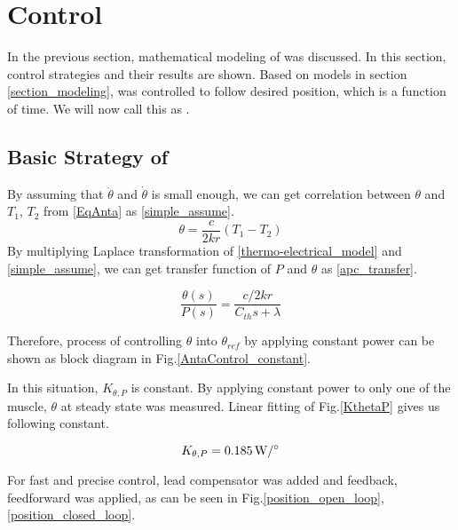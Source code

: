 \section{Control}
In the previous section, mathematical modeling of \scp was discussed. In this section, control strategies and their results are shown. Based on models in section \ref{section_modeling}, \anta was controlled to follow desired position, which is a function of time. We will now call this as \apcnospace.

\subsection{Basic Strategy of \APC}
By assuming that $\ddot{\theta}$ and $\dot{\theta}$ is small enough, we can get correlation between $\theta$ and $T_{1}$, $T_{2}$ from \eqref{EqAnta} as \eqref{simple_assume}.
\begin{equation} \label{simple_assume}
\theta = \frac{c}{2kr}(T_{1}-T_{2})
\end{equation}
By multiplying Laplace transformation of \eqref{thermo-electrical_model} and \eqref{simple_assume}, we can get transfer function of $P$ and $\theta$ as \eqref{apc_transfer}.

\begin{equation} \label{apc_transfer}
\frac{\theta(s)}{P(s)} = \frac{c/2kr}{C_{th}s+\lambda}
\end{equation}

Therefore, process of controlling $\theta$ into $\theta_{ref}$ by applying constant power can be shown as block diagram in Fig.\ref{AntaControl_constant}. 

In this situation, $K_{\theta,P}$ is constant. By applying constant power to only one of the muscle, $\theta$ at steady state was measured. Linear fitting of Fig.\ref{KthetaP} gives us following constant.

\begin{equation}
K_{\theta,P} = \SI{0.185}{\watt\per\degree} \notag
\end{equation}

For fast and precise control, lead compensator was added and feedback, feedforward was applied, as can be seen in Fig.\ref{position_open_loop}, \ref{position_closed_loop}.

